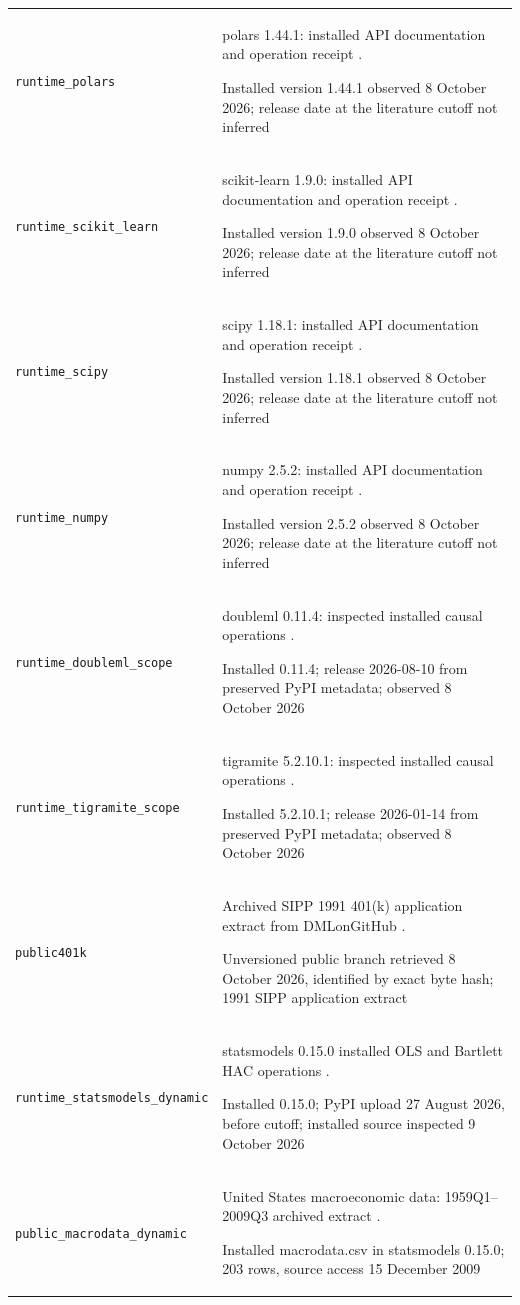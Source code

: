 \begin{longtable}{P{32mm}P{112mm}}
{\scriptsize\texttt{runtime\_polars}} & polars 1.44.1: installed API documentation and operation receipt \citep{runtime_polars}.\par Installed version 1.44.1 observed 8 October 2026; release date at the literature cutoff not inferred\\
{\scriptsize\texttt{runtime\_scikit\_learn}} & scikit-learn 1.9.0: installed API documentation and operation receipt \citep{runtime_scikit_learn}.\par Installed version 1.9.0 observed 8 October 2026; release date at the literature cutoff not inferred\\
{\scriptsize\texttt{runtime\_scipy}} & scipy 1.18.1: installed API documentation and operation receipt \citep{runtime_scipy}.\par Installed version 1.18.1 observed 8 October 2026; release date at the literature cutoff not inferred\\
{\scriptsize\texttt{runtime\_numpy}} & numpy 2.5.2: installed API documentation and operation receipt \citep{runtime_numpy}.\par Installed version 2.5.2 observed 8 October 2026; release date at the literature cutoff not inferred\\
{\scriptsize\texttt{runtime\_doubleml\_scope}} & doubleml 0.11.4: inspected installed causal operations \citep{runtime_doubleml_scope}.\par Installed 0.11.4; release 2026-08-10 from preserved PyPI metadata; observed 8 October 2026\\
{\scriptsize\texttt{runtime\_tigramite\_scope}} & tigramite 5.2.10.1: inspected installed causal operations \citep{runtime_tigramite_scope}.\par Installed 5.2.10.1; release 2026-01-14 from preserved PyPI metadata; observed 8 October 2026\\
{\scriptsize\texttt{public401k}} & Archived SIPP 1991 401(k) application extract from DMLonGitHub \citep{public401k}.\par Unversioned public branch retrieved 8 October 2026, identified by exact byte hash; 1991 SIPP application extract\\
{\scriptsize\texttt{runtime\_statsmodels\_dynamic}} & statsmodels 0.15.0 installed OLS and Bartlett HAC operations \citep{runtime_statsmodels_dynamic}.\par Installed 0.15.0; PyPI upload 27 August 2026, before cutoff; installed source inspected 9 October 2026\\
{\scriptsize\texttt{public\_macrodata\_dynamic}} & United States macroeconomic data: 1959Q1–2009Q3 archived extract \citep{public_macrodata_dynamic}.\par Installed macrodata.csv in statsmodels 0.15.0; 203 rows, source access 15 December 2009\\

\end{longtable}
